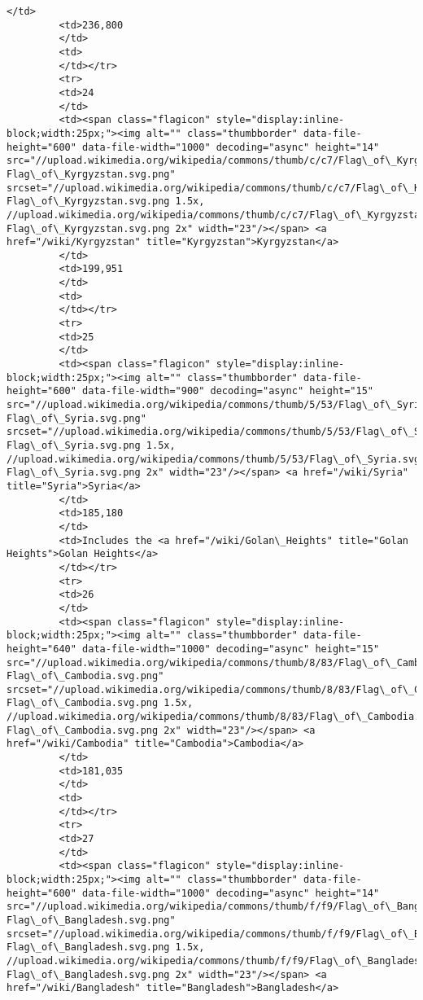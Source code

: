 \documentclass[11pt]{article}
\begin{document}
\begin{Verbatim}[commandchars=\\\{\}]
         </td>
         <td>236,800
         </td>
         <td>
         </td></tr>
         <tr>
         <td>24
         </td>
         <td><span class="flagicon" style="display:inline-block;width:25px;"><img alt="" class="thumbborder" data-file-height="600" data-file-width="1000" decoding="async" height="14" src="//upload.wikimedia.org/wikipedia/commons/thumb/c/c7/Flag\_of\_Kyrgyzstan.svg/23px-Flag\_of\_Kyrgyzstan.svg.png" srcset="//upload.wikimedia.org/wikipedia/commons/thumb/c/c7/Flag\_of\_Kyrgyzstan.svg/35px-Flag\_of\_Kyrgyzstan.svg.png 1.5x, //upload.wikimedia.org/wikipedia/commons/thumb/c/c7/Flag\_of\_Kyrgyzstan.svg/46px-Flag\_of\_Kyrgyzstan.svg.png 2x" width="23"/></span> <a href="/wiki/Kyrgyzstan" title="Kyrgyzstan">Kyrgyzstan</a>
         </td>
         <td>199,951
         </td>
         <td>
         </td></tr>
         <tr>
         <td>25
         </td>
         <td><span class="flagicon" style="display:inline-block;width:25px;"><img alt="" class="thumbborder" data-file-height="600" data-file-width="900" decoding="async" height="15" src="//upload.wikimedia.org/wikipedia/commons/thumb/5/53/Flag\_of\_Syria.svg/23px-Flag\_of\_Syria.svg.png" srcset="//upload.wikimedia.org/wikipedia/commons/thumb/5/53/Flag\_of\_Syria.svg/35px-Flag\_of\_Syria.svg.png 1.5x, //upload.wikimedia.org/wikipedia/commons/thumb/5/53/Flag\_of\_Syria.svg/45px-Flag\_of\_Syria.svg.png 2x" width="23"/></span> <a href="/wiki/Syria" title="Syria">Syria</a>
         </td>
         <td>185,180
         </td>
         <td>Includes the <a href="/wiki/Golan\_Heights" title="Golan Heights">Golan Heights</a>
         </td></tr>
         <tr>
         <td>26
         </td>
         <td><span class="flagicon" style="display:inline-block;width:25px;"><img alt="" class="thumbborder" data-file-height="640" data-file-width="1000" decoding="async" height="15" src="//upload.wikimedia.org/wikipedia/commons/thumb/8/83/Flag\_of\_Cambodia.svg/23px-Flag\_of\_Cambodia.svg.png" srcset="//upload.wikimedia.org/wikipedia/commons/thumb/8/83/Flag\_of\_Cambodia.svg/35px-Flag\_of\_Cambodia.svg.png 1.5x, //upload.wikimedia.org/wikipedia/commons/thumb/8/83/Flag\_of\_Cambodia.svg/46px-Flag\_of\_Cambodia.svg.png 2x" width="23"/></span> <a href="/wiki/Cambodia" title="Cambodia">Cambodia</a>
         </td>
         <td>181,035
         </td>
         <td>
         </td></tr>
         <tr>
         <td>27
         </td>
         <td><span class="flagicon" style="display:inline-block;width:25px;"><img alt="" class="thumbborder" data-file-height="600" data-file-width="1000" decoding="async" height="14" src="//upload.wikimedia.org/wikipedia/commons/thumb/f/f9/Flag\_of\_Bangladesh.svg/23px-Flag\_of\_Bangladesh.svg.png" srcset="//upload.wikimedia.org/wikipedia/commons/thumb/f/f9/Flag\_of\_Bangladesh.svg/35px-Flag\_of\_Bangladesh.svg.png 1.5x, //upload.wikimedia.org/wikipedia/commons/thumb/f/f9/Flag\_of\_Bangladesh.svg/46px-Flag\_of\_Bangladesh.svg.png 2x" width="23"/></span> <a href="/wiki/Bangladesh" title="Bangladesh">Bangladesh</a>

\end{Verbatim}
\end{document}
